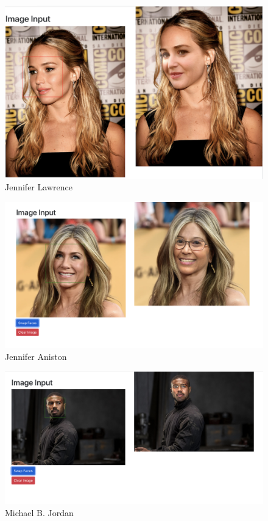 \begin{figure}[t]
    \centering
    \includegraphics[width=\linewidth]{Screen Shot 2022-05-09 at 4.06.05 PM.png}
    \caption{Jennifer Lawrence}
    \label{fig:result1}
\end{figure}

\begin{figure}[t]
    \centering
    \includegraphics[width=\linewidth]{jennifer_aniston_result.png}
    \caption{Jennifer Aniston}
    \label{fig:result2}
\end{figure}

\begin{figure}[t]
    \centering
    \includegraphics[width=\linewidth]{michael_b_jordan_result.png}
    \caption{Michael B. Jordan}
    \label{fig:result3}
\end{figure}

